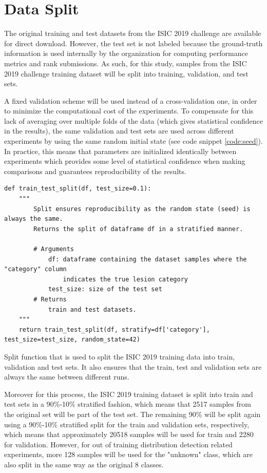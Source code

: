 \section{Data Split}
\label{section:split}
    The original training and test datasets from the \ac{ISIC} 2019 challenge are available for direct download. However, the test set is not labeled because the ground-truth information is used internally by the organization for computing performance metrics and rank submissions. As such, for this study, samples from the \ac{ISIC} 2019 challenge training dataset will be split into training, validation, and test sets. \par

    A fixed validation scheme will be used instead of a cross-validation one, in order to minimize the computational cost of the experiments. To compensate for this lack of averaging over multiple folds of the data (which gives statistical confidence in the results), the same validation and test sets are used across different experiments by using the same random initial state (see code snippet \ref{code:seed}). In practice, this means that parameters are initialized identically between experiments which provides some level of statistical confidence when making comparisons and guarantees reproducibility of the results.
    
    \begin{listing}[ht]
    \begin{verbatim}
def train_test_split(df, test_size=0.1):
    """ 
        Split ensures reproducibility as the random state (seed) is always the same.
        Returns the split of dataframe df in a stratified manner. 
        
        # Arguments
            df: dataframe containing the dataset samples where the "category" column 
                indicates the true lesion category
            test_size: size of the test set
        # Returns    
            train and test datasets.
    """
    return train_test_split(df, stratify=df['category'], test_size=test_size, random_state=42)
    \end{verbatim}
    \caption{Split function that is used to split the \ac{ISIC} 2019 training data into train, validation and test sets. It also ensures that the train, test and validation sets are always the same between different runs.}
    \label{code:seed}
    \end{listing}
    
    Moreover for this process, the \ac{ISIC} 2019 training dataset is split into train and test sets in a 90\%-10\% stratified fashion, which means that 2517 samples from the original set will be part of the test set.  The remaining 90\% will be split again using a 90\%-10\% stratified split for the train and validation sets, respectively, which means that approximately 20518 samples will be used for train and 2280 for validation. However, for out of training distribution detection related experiments, more 128 samples will be used for the "unknown" class, which are also split in the same way as the original 8 classes. \par
    
